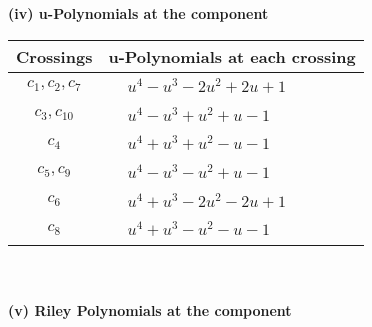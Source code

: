 \documentclass[1p]{elsarticle_modified}
\theoremstyle{definition}
\begin{document}
\newpage\renewcommand{\arraystretch}{1}
\flushleft \textbf{(iv) u-Polynomials at the component}\newline \\
\begin{tabular}{m{50pt}|m{274pt}}
Crossings & \hspace{64pt}u-Polynomials at each crossing \\
\hline $$\begin{aligned}c_{1},c_{2},c_{7}\end{aligned}$$&$\begin{aligned}
&u^4- u^3-2 u^2+2 u+1
\end{aligned}$\\
\hline $$\begin{aligned}c_{3},c_{10}\end{aligned}$$&$\begin{aligned}
&u^4- u^3+u^2+u-1
\end{aligned}$\\
\hline $$\begin{aligned}c_{4}\end{aligned}$$&$\begin{aligned}
&u^4+u^3+u^2- u-1
\end{aligned}$\\
\hline $$\begin{aligned}c_{5},c_{9}\end{aligned}$$&$\begin{aligned}
&u^4- u^3- u^2+u-1
\end{aligned}$\\
\hline $$\begin{aligned}c_{6}\end{aligned}$$&$\begin{aligned}
&u^4+u^3-2 u^2-2 u+1
\end{aligned}$\\
\hline $$\begin{aligned}c_{8}\end{aligned}$$&$\begin{aligned}
&u^4+u^3- u^2- u-1
\end{aligned}$\\
\hline
\end{tabular}\\~\\
\newpage\renewcommand{\arraystretch}{1}
\flushleft \textbf{(v) Riley Polynomials at the component}\newline \\
\end{document}
